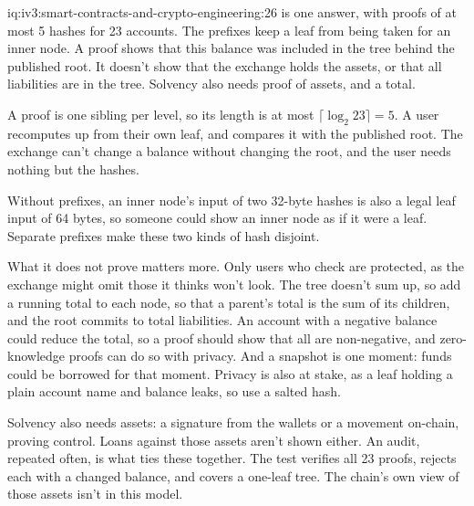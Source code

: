\begin{solution}{iq:iv3:smart-contracts-and-crypto-engineering:26}
 is one answer, with proofs of at most 5 hashes for 23 accounts. The prefixes keep a leaf from being taken for an inner node. A proof shows that this balance was included in the tree behind the published root. It doesn't show that the exchange holds the assets, or that all liabilities are in the tree. Solvency also needs proof of assets, and a total.
\label{lst:iv3:cr:merkle}

A proof is one sibling per level, so its length is at most $\lceil \log_2 23 \rceil = 5$. A user recomputes up from their own leaf, and compares it with the published root. The exchange can't change a balance without changing the root, and the user needs nothing but the hashes.

Without prefixes, an inner node's input of two 32-byte hashes is also a legal leaf input of 64 bytes, so someone could show an inner node as if it were a leaf. Separate prefixes make these two kinds of hash disjoint.

What it does not prove matters more. Only users who check are protected, as the exchange might omit those it thinks won't look. The tree doesn't sum up, so add a running total to each node, so that a parent's total is the sum of its children, and the root commits to total liabilities. An account with a negative balance could reduce the total, so a proof should show that all are non-negative, and zero-knowledge proofs can do so with privacy. And a snapshot is one moment: funds could be borrowed for that moment. Privacy is also at stake, as a leaf holding a plain account name and balance leaks, so use a salted hash.

Solvency also needs assets: a signature from the wallets or a movement on-chain, proving control. Loans against those assets aren't shown either. An audit, repeated often, is what ties these together. The test verifies all 23 proofs, rejects each with a changed balance, and covers a one-leaf tree. The chain's own view of those assets isn't in this model.

\end{solution}

